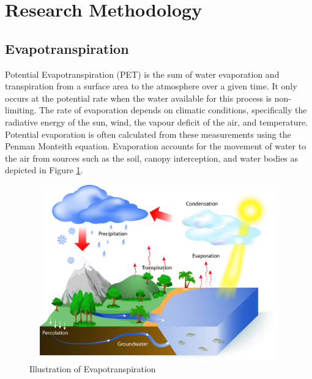 \documentclass[12pt,a4paper]{article}
\begin{document}
\section{Research Methodology}
\subsection{Evapotranspiration}
Potential Evapotranspiration (PET) is the sum of water evaporation and transpiration from a surface area to the atmosphere over a given time\cite{van1966potential}.  
 It only occurs at the potential rate when the water available for this process is non-limiting. The rate of evaporation depends on climatic conditions, specifically the radiative energy of the sun, wind, the vapour deficit of the air, and temperature. Potential evaporation is often calculated from these measurements using the Penman Monteith equation. Evaporation accounts for the movement of water to the air from sources such as the soil, canopy interception, and water bodies as depicted in Figure \ref{fig:evapo}.
\begin{figure}[!h]
			\includegraphics[width=430pt,  height=215pt]{./gaphics/evapotranspiration.jpg}
			\caption{Illustration of Evapotranspiration}
			\label{fig:evapo}
\end{figure}
\end{document}
